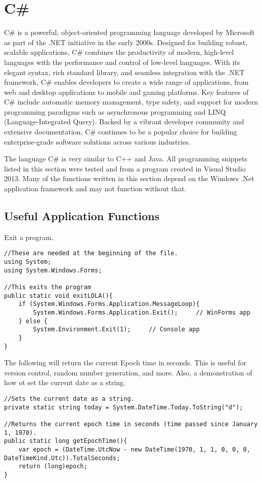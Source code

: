 \chapter{C\#}
\thispagestyle{fancy}
\lstset{language=[Sharp]C, style=csharpstyle}

C\# is a powerful, object-oriented programming language developed by Microsoft as part of the .NET initiative in the early 2000s. Designed for building robust, scalable applications, C\# combines the productivity of modern, high-level languages with the performance and control of low-level languages. With its elegant syntax, rich standard library, and seamless integration with the .NET framework, C\# enables developers to create a wide range of applications, from web and desktop applications to mobile and gaming platforms. Key features of C\# include automatic memory management, type safety, and support for modern programming paradigms such as asynchronous programming and LINQ (Language-Integrated Query). Backed by a vibrant developer community and extensive documentation, C\# continues to be a popular choice for building enterprise-grade software solutions across various industries.

\myindent The language C\# is very similar to C++ and Java. All programming snippets listed in this section were tested and from a program created in Visual Studio 2013. Many of the functions written in this section depend on the Windows .Net application framework and may not function without that.

\section{Useful Application Functions}

Exit a program.
\begin{lstlisting}
//These are needed at the beginning of the file.
using System;
using System.Windows.Forms;

//This exits the program
public static void exitLOLA(){
	if (System.Windows.Forms.Application.MessageLoop){
		System.Windows.Forms.Application.Exit();     // WinForms app
	} else {
		System.Environment.Exit(1);     // Console app
	}
}
\end{lstlisting} 

The following will return the current Epoch time in seconds. This is useful for version control, random number generation, and more. Also, a demonstration of how ot set the current date as a string.
\begin{lstlisting}
//Sets the current date as a string.
private static string today = System.DateTime.Today.ToString("d");

//Returns the current epoch time in seconds (time passed since January 1, 1970).
public static long getEpochTime(){
	var epoch = (DateTime.UtcNow - new DateTime(1970, 1, 1, 0, 0, 0, DateTimeKind.Utc)).TotalSeconds;
	return (long)epoch;
}
\end{lstlisting}


